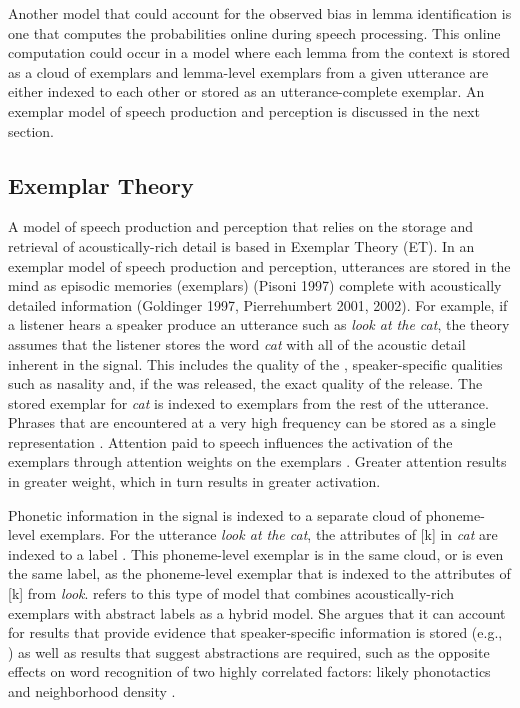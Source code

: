 Another model that could account for the observed bias in lemma identification is one that computes the probabilities online during speech processing.  This online computation could occur in a model where each lemma from the context is stored as a cloud of exemplars and lemma-level exemplars from a given utterance are either indexed to each other or stored as an utterance-complete exemplar.  An exemplar model of speech production and perception is discussed in the next section.


		\subsection{Exemplar Theory}\label{exemplar}

A model of speech production and perception that relies on the storage and retrieval of acoustically-rich detail is based in Exemplar Theory (ET).  In an exemplar model of speech production and perception, utterances are stored in the mind as episodic memories (exemplars) (Pisoni 1997) complete with acoustically detailed information (Goldinger 1997, Pierrehumbert 2001, 2002).  For example, if a listener hears a speaker produce an utterance such as \textit{look at the cat}, the theory assumes that the listener stores the word \textit{cat} with all of the acoustic detail inherent in the signal.  This includes the quality of the , speaker-specific qualities such as nasality and, if the  was released, the exact quality of the release.  The stored exemplar for \textit{cat} is indexed to exemplars from the rest of the utterance.  Phrases that are encountered at a very high frequency can be stored as a single representation \cite{bybee2006}. Attention paid to speech influences the activation of the exemplars through attention weights on the exemplars \cite{nosofsky1986}.  Greater attention results in greater weight, which in turn results in greater activation. \nocite{goldinger1997,pierrehumbert2001,pierrehumbert2002,pisoni1997}  

Phonetic information in the signal is indexed to a separate cloud of phoneme-level exemplars.  For the utterance \textit{look at the cat}, the attributes of [k] in \textit{cat} are indexed to a label .  This phoneme-level exemplar is in the same cloud, or is even the same label, as the phoneme-level exemplar  that is indexed to the attributes of [k] from \textit{look}.   refers to this type of model that combines acoustically-rich exemplars with abstract labels as a hybrid model.  She argues that it can account for results that provide evidence that speaker-specific information is stored (e.g., ) as well as results that suggest abstractions are required, such as the opposite effects on word recognition of two highly correlated factors: likely phonotactics and neighborhood density \cite{vitevitchluce1999}.  

